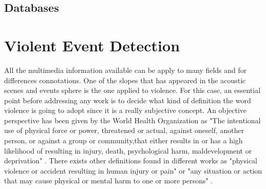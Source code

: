 \subsection{Databases}

\section{Violent Event Detection}
All the multimedia information available can be apply to many fields and for differences connotations. One of the slopes that has appeared in the acoustic scenes and events sphere is the one applied to violence. For this case, an essential point before addressing any work is to decide what kind of definition the word violence is going to adopt since it is a really subjective concept. An objective perspective has been given by the World Health Organization as "The  intentional  use  of physical  force  or  power,  threatened  or  actual,  against oneself, another person, or against a group or community,that either results in or has a high likelihood of resulting in injury,  death,  psychological  harm,  maldevelopment  or deprivation" \cite{Krug2002}. There exists other definitions found in different works as "physical violence or accident resulting in human injury or pain" \cite{Demarty2013} or "any situation or action that may cause physical or mental harm to one or more persons" \cite{Giannakopoulos2006}.

